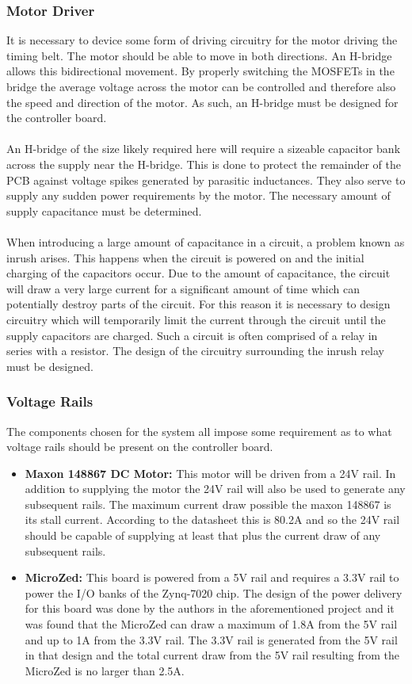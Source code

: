 \subsubsection{Motor Driver}
It is necessary to device some form of driving circuitry for the motor driving the timing belt.
The motor should be able to move in both directions. 
An H-bridge allows this bidirectional movement.
By properly switching the MOSFETs in the bridge the average voltage across the motor can be controlled and therefore also the speed and direction of the motor.
As such, an H-bridge must be designed for the controller board.
\\~\\
An H-bridge of the size likely required here will require a sizeable capacitor bank across the supply near the H-bridge.
This is done to protect the remainder of the PCB against voltage spikes generated by parasitic inductances. 
They also serve to supply any sudden power requirements by the motor.
The necessary amount of supply capacitance must be determined.
\\~\\
When introducing a large amount of capacitance in a circuit, a problem known as inrush arises.
This happens when the circuit is powered on and the initial charging of the capacitors occur.
Due to the amount of capacitance, the circuit will draw a very large current for a significant amount of time which can potentially destroy parts of the circuit.
For this reason it is necessary to design circuitry which will temporarily limit the current through the circuit until the supply capacitors are charged.
Such a circuit is often comprised of a relay in series with a resistor.
The design of the circuitry surrounding the inrush relay must be designed.

\subsubsection{Voltage Rails}
The components chosen for the system all impose some requirement as to what voltage rails should be present on the controller board.
\begin{itemize}
	\item \textbf{Maxon 148867 DC Motor:} This motor will be driven from a 24V rail.
	In addition to supplying the motor the 24V rail will also be used to generate any subsequent rails.
	The maximum current draw possible the maxon 148867 is its stall current. 
	According to the datasheet this is 80.2A and so the 24V rail should be capable of supplying at least that plus the current draw of any subsequent rails.
	\item  \textbf{MicroZed:} This board is powered from a 5V rail and requires a 3.3V rail to power the I/O banks of the Zynq-7020 chip.
	The design of the power delivery for this board was done by the authors in the aforementioned project \cite{isaswarm} and it was found that the MicroZed can draw a maximum of 1.8A from the 5V rail and up to 1A from the 3.3V rail.
	The 3.3V rail is generated from the 5V rail in that design and the total current draw from the 5V rail resulting from the MicroZed is no larger than 2.5A. 
\end{itemize}



